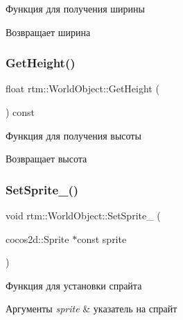 Функция для получения ширины 

\begin{DoxyReturn}{Возвращает}
ширина 
\end{DoxyReturn}
\mbox{\label{classrtm_1_1_world_object_ac1ab514e4556b3d8b9d4ffda5eba9db2}} 
\subsubsection{\texorpdfstring{Get\+Height()}{GetHeight()}}
{\footnotesize\ttfamily float rtm\+::\+World\+Object\+::\+Get\+Height (\begin{DoxyParamCaption}{ }\end{DoxyParamCaption}) const}



Функция для получения высоты 

\begin{DoxyReturn}{Возвращает}
высота 
\end{DoxyReturn}
\mbox{\label{classrtm_1_1_world_object_ae8f0605c11c95bf6eae8f42c24fc4130}} 
\subsubsection{\texorpdfstring{Set\+Sprite\+\_\+()}{SetSprite\_()}}
{\footnotesize\ttfamily void rtm\+::\+World\+Object\+::\+Set\+Sprite\+\_\+ (\begin{DoxyParamCaption}\item[{cocos2d\+::\+Sprite $\ast$const}]{sprite }\end{DoxyParamCaption})\hspace{0.3cm}{\ttfamily [protected]}}



Функция для установки спрайта 


\begin{DoxyParams}{Аргументы}
{\em sprite} & указатель на спрайт \\
\hline
\end{DoxyParams}
\mbox{\label{classrtm_1_1_world_object_a66fcf7be3345584be9f06e00a79da559}} 
